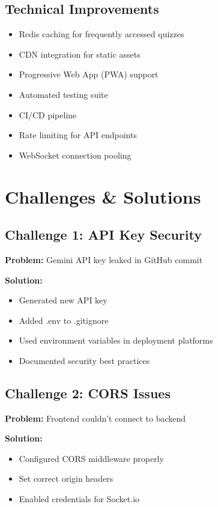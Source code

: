 \documentclass[12pt,a4paper]{article}
\begin{document}
\subsection{Technical Improvements}
\begin{itemize}
    \item Redis caching for frequently accessed quizzes
    \item CDN integration for static assets
    \item Progressive Web App (PWA) support
    \item Automated testing suite
    \item CI/CD pipeline
    \item Rate limiting for API endpoints
    \item WebSocket connection pooling
\end{itemize}

\newpage

\section{Challenges \& Solutions}

\subsection{Challenge 1: API Key Security}
\textbf{Problem:} Gemini API key leaked in GitHub commit

\textbf{Solution:}
\begin{itemize}
    \item Generated new API key
    \item Added .env to .gitignore
    \item Used environment variables in deployment platforms
    \item Documented security best practices
\end{itemize}

\subsection{Challenge 2: CORS Issues}
\textbf{Problem:} Frontend couldn't connect to backend

\textbf{Solution:}
\begin{itemize}
    \item Configured CORS middleware properly
    \item Set correct origin headers
    \item Enabled credentials for Socket.io
\end{itemize}
\end{document}
